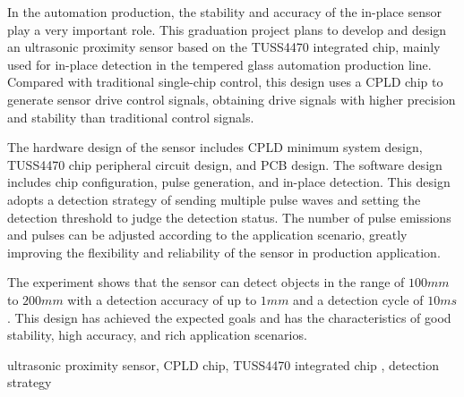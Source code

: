 \begin{EnAbstract}
    In the automation production, the stability and accuracy of the in-place sensor play a very important role. This graduation project plans to develop and design an ultrasonic proximity sensor based on the TUSS4470 integrated chip, mainly used for in-place detection in the tempered glass automation production line. Compared with traditional single-chip control, this design uses a CPLD chip to generate sensor drive control signals, obtaining drive signals with higher precision and stability than traditional control signals.\par
    The hardware design of the sensor includes CPLD minimum system design, TUSS4470 chip peripheral circuit design, and PCB design. The software design includes chip configuration, pulse generation, and in-place detection. This design adopts a detection strategy of sending multiple pulse waves and setting the detection threshold to judge the detection status. The number of pulse emissions and pulses can be adjusted according to the application scenario, greatly improving the flexibility and reliability of the sensor in production application.\par
    The experiment shows that the sensor can detect objects in the range of $100mm$ to $200mm$ with a detection accuracy of up to $1mm$ and a detection cycle of $10ms$. This design has achieved the expected goals and has the characteristics of good stability, high accuracy, and rich application scenarios.
  
  
    \EnglishKeyWord ultrasonic proximity sensor, CPLD chip, TUSS4470 integrated chip , detection strategy
\end{EnAbstract}